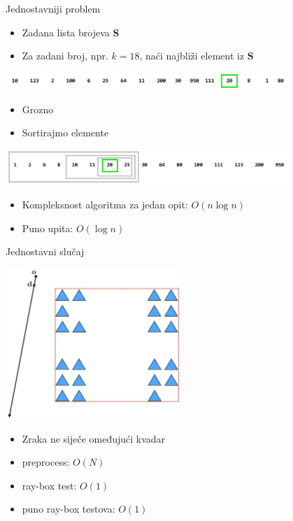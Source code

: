\documentclass[9pt]{beamer}
\begin{document}
\begin{frame}{Jednostavniji problem}
	\begin{itemize}
		\item Zadana lista brojeva \textbf{S}
		\item Za zadani broj, npr. $k=18$, naći najbliži element iz \textbf{S}
	\end{itemize}
	\begin{center}
		\includegraphics[width=0.8\textwidth]{slike/slide_011_a.jpg}
	\end{center}
	\begin{itemize}
		\item Grozno
		\item Sortirajmo elemente
	\end{itemize}
	\begin{center}
		\includegraphics[width=0.8\textwidth]{slike/slide_011_b.jpg}
	\end{center}
	\begin{itemize}
		\item Kompleksnost algoritma za jedan opit: $O(n \log n)$
		\item Puno upita: $O(\log n)$
	\end{itemize}
\end{frame}

\begin{frame}{Jednostavni slučaj}
	\begin{center}
		\includegraphics[width=0.5\textwidth]{slike/slide_013.jpg}
	\end{center}
	\begin{itemize}
		\item Zraka ne siječe omeđujući kvadar
		\item preprocess: $O(N)$
		\item ray-box test: $O(1)$
		\item puno ray-box testova: $O(1)$
	\end{itemize}
\end{frame}
\end{document}
